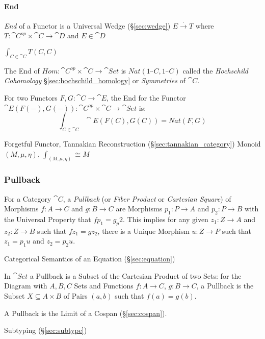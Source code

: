 \paragraph{End}\label{sec:end}\hfill

\emph{End} of a Functor is a Universal Wedge (\S\ref{sec:wedge}) $E
\xrightarrow{.} T$ where $T : \cat{C}^{op} \times \cat{C}
\rightarrow \cat{D}$ and $E \in \cat{D}$

$\int_{C \in \cat{C}} T(C,C)$

The End of $Hom : \cat{C}^{op} \times \cat{C} \rightarrow
\cat{Set}$ is $Nat (1_\cat{C},1_\cat{C})$ called the
\emph{Hochschild Cohomology} \S\ref{sec:hochschild_homology} or
\emph{Symmetries} of $\cat{C}$.

For two Functors $F,G : \cat{C} \rightarrow \cat{E}$, the End for
the Functor $\cat{E}(F(-), G(-)) : \cat{C}^{op} \times
\cat{C} \rightarrow \cat{Set}$ is:
\[
  \int_{C \in \cat{C}} \cat{E}(F(C), G(C)) = Nat (F,G)
\]

Forgetful Functor, Tannakian Reconstruction
(\S\ref{sec:tannakian_category}) %
Monoid $(M,\mu,\eta)$, $\int_{(M,\mu,\eta)} \cong M$



\subsubsection{Pullback}\label{sec:pullback}

For a Category $\cat{C}$, a \emph{Pullback} (or \emph{Fiber
  Product} or \emph{Cartesian Square}) of Morphisms $f : A \rightarrow
C$ and $g : B \rightarrow C$ are Morphisms $p_1 : P \rightarrow A$ and
$p_2 : P \rightarrow B$ with the Universal Property that $fp_1 =
g_p2$. This implies for any given $z_1 : Z \rightarrow A$ and $z_2 : Z
\rightarrow B$ such that $fz_1 = gz_2$, there is a Unique Morphism $u
: Z \rightarrow P$ such that $z_1 = p_1 u$ and $z_2 = p_2 u$.

Categorical Semantics of an Equation (\S\ref{sec:equation})

In $\cat{Set}$ a Pullback is a Subset of the Cartesian Product of two
Sets: for the Diagram with $A,B,C$ Sets and Functions $f : A
\rightarrow C$, $g : B \rightarrow C$, a Pullback is the Subset $X
\subseteq A \times B$ of Pairs $(a,b)$ such that $f(a) = g(b)$.

A Pullback is the Limit of a Cospan (\S\ref{sec:cospan}).

Subtyping (\S\ref{sec:subtype})

